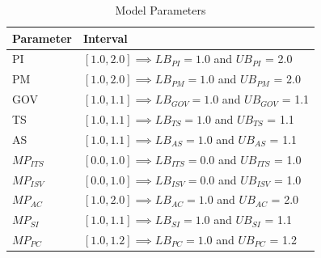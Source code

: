 \begin{table}[t]
	\centering
	\begin{tabular}{ll}
			\toprule 
			\footnotesize \textbf{Parameter} & \footnotesize \textbf{Interval} \\ \midrule
			\footnotesize PI & \footnotesize $[1.0,2.0] \implies LB_{PI} = 1.0$ and $UB_{PI}$ = 2.0 \\ 
			\footnotesize PM & \footnotesize  $[1.0,2.0] \implies LB_{PM} = 1.0$ and $UB_{PM}$ = 2.0 \\ \midrule
			\footnotesize GOV & \footnotesize $[1.0,1.1] \implies LB_{GOV} = 1.0$ and $UB_{GOV}$ = 1.1 \\
			\footnotesize TS & \footnotesize $[1.0,1.1] \implies LB_{TS} = 1.0$ and $UB_{TS}$ = 1.1 \\
			\footnotesize AS & \footnotesize $[1.0,1.1] \implies LB_{AS} = 1.0$ and $UB_{AS}$ = 1.1 \\ \midrule
			\footnotesize $MP_{ITS}$ & \footnotesize $[0.0,1.0] \implies LB_{ITS} = 0.0$ and $UB_{ITS}$ = 1.0 \\
			\footnotesize $MP_{ISV}$ & \footnotesize $[0.0,1.0] \implies LB_{ISV} = 0.0$ and $UB_{ISV}$ = 1.0 \\
			\footnotesize $MP_{AC}$ & \footnotesize $[1.0,2.0] \implies LB_{AC} = 1.0$ and $UB_{AC}$ = 2.0 \\
			\footnotesize $MP_{SI}$ & \footnotesize $[1.0,1.1] \implies LB_{SI} = 1.0$ and $UB_{SI}$ = 1.1 \\
			\footnotesize $MP_{PC}$ & \footnotesize $[1.0,1.2] \implies LB_{PC} = 1.0$ and $UB_{PC}$ = 1.2 \\ \bottomrule
	\end{tabular}
	\caption{Model Parameters}
	\label{tab:mpara}
\end{table}

